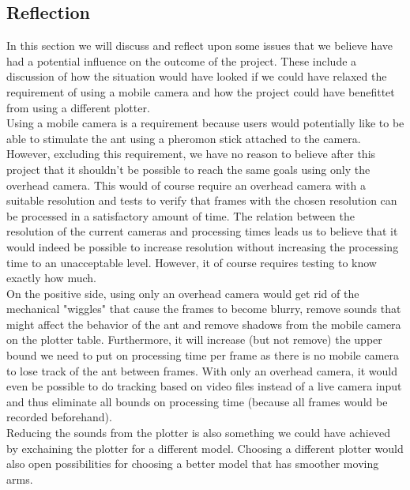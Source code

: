 
\subsection{Reflection}
In this section we will discuss and reflect upon some issues that we believe have had a potential influence on the outcome of the project. These include a discussion of how the situation would have looked if we could have relaxed the requirement of using a mobile camera and how the project could have benefittet from using a different plotter. \\

Using a mobile camera is a requirement because users would potentially like to be able to stimulate the ant using a pheromon stick attached to the camera. However, excluding this requirement, we have no reason to believe after this project that it shouldn't be possible to reach the same goals using only the overhead camera. This would of course require an overhead camera with a suitable resolution and tests to verify that frames with the chosen resolution can be processed in a satisfactory amount of time. The relation between the resolution of the current cameras and processing times leads us to believe that it would indeed be possible to increase resolution without increasing the processing time to an unacceptable level. However, it of course requires testing to know exactly how much. \\

On the positive side, using only an overhead camera would get rid of the mechanical "wiggles" that cause the frames to become blurry, remove sounds that might affect the behavior of the ant and remove shadows from the mobile camera on the plotter table. Furthermore, it will increase (but not remove) the upper bound we need to put on processing time per frame as there is no mobile camera to lose track of the ant between frames. With only an overhead camera, it would even be possible to do tracking based on   video files instead of a live camera input and thus eliminate all bounds on processing time (because all frames would be recorded beforehand). \\

Reducing the sounds from the plotter is also something we could have achieved by exchaining the plotter for a different model. Choosing a different plotter would also open possibilities for choosing a better model that has smoother moving arms.


